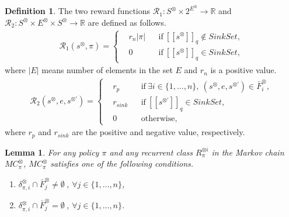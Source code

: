 \documentclass[10pt]{article}
\newtheorem{lemma}{Lemma}
\theoremstyle{definition}
\newtheorem{definition}{Definition}
\newcommand{\myspq}{\ensuremath{[\![s^{\otimes}]\!]}_q}
\newcommand{\myspdq}{\ensuremath{[\![s^{\otimes \prime}]\!]}_q}
\begin{document}
\begin{definition}
  The two reward functions $\mathcal{R}_1 : S^{\otimes} \times 2^{E^{\otimes}} \rightarrow \mathbb{R}$ and $\mathcal{R}_2 : S^{\otimes} \times E^{\otimes} \times S^{\otimes} \rightarrow \mathbb{R}$ are defined as follows.
  \begin{align}
    \mathcal{R}_1 (s^{\otimes}, \pi) =
    \left\{
    \begin{aligned}
      & r_{n}|\pi| & &\text{if} \ \myspq \notin SinkSet , \\
      & 0 & &\text{if} \ \myspq \in SinkSet,
    \end{aligned}
    \right.
  \end{align}
  where $|E|$ means number of elements in the set $E$ and $r_{n}$ is a positive value.
  \begin{align}
    \mathcal{R}_2(s^{\otimes}, e, s^{\otimes \prime}) =
    \left\{
    \begin{aligned}
      &r_p & & \text{if}\ \exists i \in \! \{ 1, \ldots ,n \},\ (s^{\otimes}, e, s^{\otimes \prime}) \in \bar{F}^{\otimes}_i \!,\\
      &r_{sink} & & \text{if}\ \myspdq \in SinkSet,\\
      &0 & & \text{otherwise},
    \end{aligned}
    \right.
  \end{align}
  where $r_p$ and $r_{sink}$ are the positive and negative value, respectively.
  \label{reward_def}
\end{definition}

\begin{lemma}
  For any policy $\pi$ and any recurrent class $R^{\otimes i}_{\pi}$ in the Markov chain $MC^{\otimes}_{\pi}$,
  $MC^{\otimes}_{\pi}$ satisfies one of the following conditions.
  \vspace{2mm}
  \begin{enumerate}
    \item $\delta^{\otimes}_{\pi,i} \cap \bar{F}^{\otimes}_j \neq \emptyset\ $, $ \forall j \in \{ 1, \ldots ,n \}$,
    \item $\delta^{\otimes}_{\pi,i} \cap \bar{F}^{\otimes}_j = \emptyset\ $, $ \forall j \in \{ 1, \ldots ,n \}$.
  \end{enumerate}
  \label{lemma3-1}
\end{lemma}
\end{document}
